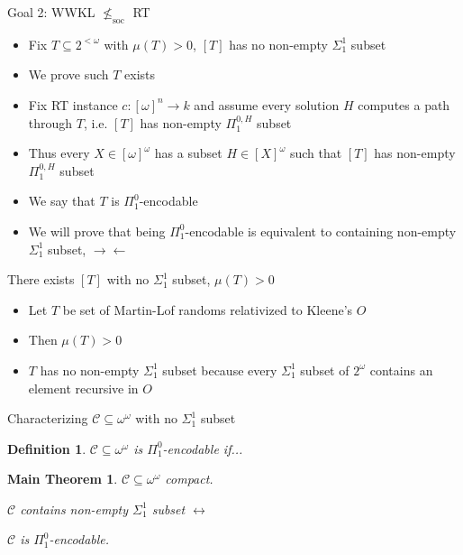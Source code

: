 \documentclass[notes]{beamer}
\begin{document}
\begin{frame}{Goal 2: WWKL $\nleq_{\text{soc}}$ RT}
  \begin{itemize}
    \item Fix $T\subseteq 2^{<\omega}$ with $\mu(T)>0$, $[T]$
      has no non-empty $\Sigma_1^1$ subset
    \item We prove such $T$ exists
    \item Fix RT instance $c:[\omega]^n\rightarrow k$ and assume every
      solution $H$ computes a path through $T$, i.e. $[T]$ has non-empty
      $\Pi_1^{0,H}$ subset
    \item Thus every $X\in[\omega]^\omega$ has a subset
      $H\in[X]^\omega$ such that $[T]$ has non-empty $\Pi_1^{0,H}$ subset
    \item We say that $T$ is $\Pi_1^0$-encodable
    \item We will prove that being $\Pi_1^0$-encodable is equivalent to
      containing non-empty $\Sigma_1^1$ subset, $\rightarrow\leftarrow$
  \end{itemize}
\end{frame}

\begin{frame}{There exists $[T]$ with no $\Sigma_1^1$ subset, $\mu(T)>0$}
  \begin{itemize}
    \item Let $T$ be set of Martin-Lof randoms relativized to Kleene's $O$
    \item Then $\mu(T)>0$
    \item $T$ has no non-empty $\Sigma_1^1$ subset because every
      $\Sigma_1^1$ subset of $2^\omega$ contains an element recursive in
      $O$
  \end{itemize}
\end{frame}

\begin{frame}{Characterizing $\mathcal{C}\subseteq \omega^{\omega}$ with no
  $\Sigma_1^1$ subset}

  \newtheorem{def-encodable}{Definition}
  \begin{def-encodable}
    $\mathcal{C}\subseteq \omega^{\omega}$ is $\Pi_1^0$-encodable if...
  \end{def-encodable}

  \newtheorem{main}{Main Theorem}
  \begin{main}
    $\mathcal{C}\subseteq \omega^{\omega}$ compact.

    $\mathcal{C}$ contains non-empty $\Sigma_1^1$ subset
    $\leftrightarrow$

    $\mathcal{C}$ is $\Pi_1^0$-encodable.
  \end{main}
\end{frame}
\end{document}

